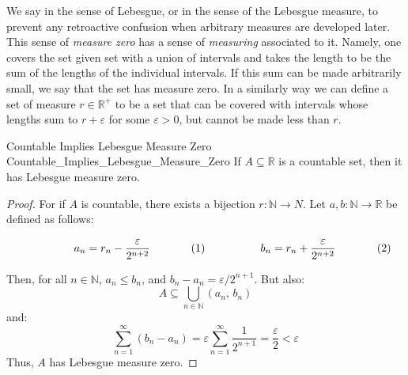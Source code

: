 \documentclass[crop=false,class=article]{standalone}                           %
\begin{document}
        We say in the sense of Lebesgue, or in the sense of the Lebesgue
        measure, to prevent any retroactive confusion when arbitrary measures
        are developed later. This sense of \textit{measure zero} has a sense of
        \textit{measuring} associated to it. Namely, one covers the set given
        set with a union of intervals and takes the length to be the sum of the
        lengths of the individual intervals. If this sum can be made arbitrarily
        small, we say that the set has measure zero. In a similarly way we can
        define a set of measure $r\in\mathbb{R}^{+}$ to be a set that can be
        covered with intervals whose lengths sum to $r+\varepsilon$ for some
        $\varepsilon>0$, but cannot be made less than $r$.
        \begin{ltheorem}{Countable Implies Lebesgue Measure Zero}
                        {Countable_Implies_Lebesgue_Measure_Zero}
            If $A\subseteq\mathbb{R}$ is a countable set, then it has Lebesgue
            measure zero.
        \end{ltheorem}
        \begin{proof}
            For if $A$ is countable, there exists a bijection
            $r:\mathbb{N}\rightarrow{N}$. Let
            $a,b:\mathbb{N}\rightarrow\mathbb{R}$ be defined as follows:
            \par
            \begin{subequations}
                \begin{minipage}[b]{0.49\textwidth}
                    \begin{equation}
                        a_{n}=r_{n}-\frac{\varepsilon}{2^{n+2}}
                    \end{equation}
                \end{minipage}
                \hfill
                \begin{minipage}[b]{0.49\textwidth}
                    \begin{equation}
                        b_{n}=r_{n}+\frac{\varepsilon}{2^{n+2}}
                    \end{equation}
                \end{minipage}
            \end{subequations}
            \par\vspace{2.5ex}
            Then, for all $n\in\mathbb{N}$, $a_{n}\leq{b}_{n}$, and
            $b_{n}-a_{n}=\varepsilon/2^{n+1}$. But also:
            \begin{equation}
                A\subseteq\bigcup_{n\in\mathbb{N}}(a_{n},\,b_{n})
            \end{equation}
            and:
            \begin{equation}
                \sum_{n=1}^{\infty}(b_{n}-a_{n})
                =\varepsilon\sum_{n=1}^{\infty}\frac{1}{2^{n+1}}
                =\frac{\varepsilon}{2}<\varepsilon
            \end{equation}
            Thus, $A$ has Lebesgue measure zero.
        \end{proof}
\end{document}
